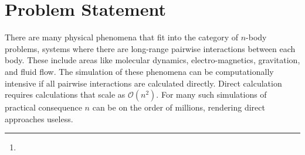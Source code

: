 \documentclass[review]{siamart}
\author{\TheName\thanks{\TheAddress}}
\title{{\TheTitle}}
\begin{document}
\maketitle

\vspace{1cm}

%

\section{Problem Statement}\label{sec:problem}
There are many physical phenomena that fit into the category of $n$-body problems, systems where there are long-range pairwise interactions between each body. These include areas like molecular dynamics, electro-magnetics, gravitation, and fluid flow. The simulation of these phenomena can be computationally intensive if all pairwise interactions are calculated directly. Direct calculation requires calculations that scale as $\mathcal{O}(n^2)$. For many such simulations of practical consequence $n$ can be on the order of millions, rendering direct approaches useless.
\end{document}
